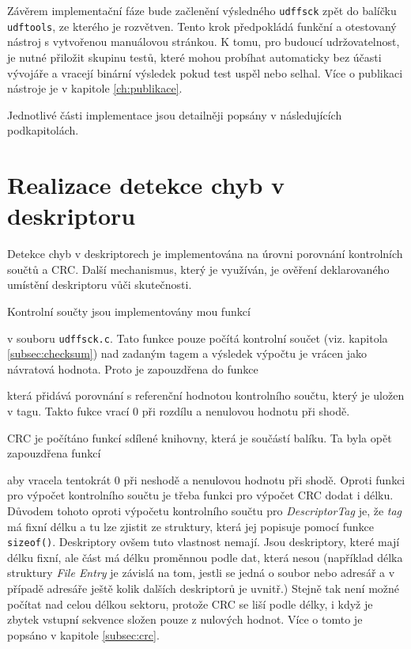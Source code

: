 Závěrem implementační fáze bude začlenění výsledného \texttt{udffsck} zpět do balíčku \texttt{udftools}, ze kterého je rozvětven. Tento krok předpokládá funkční a otestovaný nástroj s vytvořenou manuálovou stránkou. K tomu, pro budoucí udržovatelnost, je nutné přiložit skupinu testů, které mohou probíhat automaticky bez účasti vývojáře a vracejí binární výsledek pokud test uspěl nebo selhal. Více o publikaci nástroje je v kapitole \ref{ch:publikace}.

Jednotlivé části implementace jsou detailněji popsány v následujících podkapitolách.

\section{Realizace detekce chyb v deskriptoru}
\label{sec:realizace-detekce}
Detekce chyb v deskriptorech je implementována na úrovni porovnání kontrolních součtů a CRC. Další mechanismus, který je využíván, je ověření deklarovaného umístění deskriptoru vůči skutečnosti.

Kontrolní součty jsou implementovány mou funkcí

\centerline{\texttt{}}

v souboru \texttt{udffsck.c}. Tato funkce pouze počítá kontrolní součet (viz. kapitola \ref{subsec:checksum}) nad zadaným tagem a výsledek výpočtu je vrácen jako návratová hodnota. Proto je zapouzdřena do funkce
 
\centerline{\texttt{}}

která přidává porovnání s referenční hodnotou kontrolního součtu, který je uložen v tagu. Takto fukce vrací 0 při rozdílu a nenulovou hodnotu při shodě.

CRC je počítáno funkcí sdílené knihovny, která je součástí balíku. Ta byla opět zapouzdřena funkcí

\centerline{\texttt{}}

aby vracela tentokrát 0 při neshodě a nenulovou hodnotu při shodě. Oproti funkci pro výpočet kontrolního součtu je třeba funkci pro výpočet CRC dodat i délku. Důvodem tohoto oproti výpočetu kontrolního součtu pro \textit{DescriptorTag} je, že \textit{tag} má fixní délku a tu lze zjistit ze struktury, která jej popisuje pomocí funkce \texttt{sizeof()}. Deskriptory ovšem tuto vlastnost nemají. Jsou deskriptory, které mají délku fixní, ale část má délku proměnnou podle dat, která nesou (například délka struktury \textit{File Entry} je závislá na tom, jestli se jedná o soubor nebo adresář a v případě adresáře ještě kolik dalších deskriptorů je uvnitř.) Stejně tak není možné počítat nad celou délkou sektoru, protože CRC se liší podle délky, i když je zbytek vstupní sekvence složen pouze z nulových hodnot. Více o tomto je popsáno v kapitole \ref{subsec:crc}.

